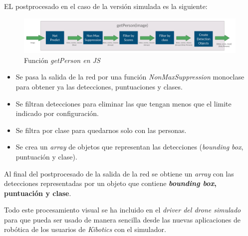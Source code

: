 EL postprocesado en el caso de la versión simulada es la siguiente:
\begin{figure}[H]
  \begin{center}
    \includegraphics[width=1\textwidth]{figures/simulado/getPersonjs.png}
		\caption{Función \textit{getPerson en JS}}
		\label{fig:getPersonjs}
		\end{center}
\end{figure}
\begin{itemize}
  \item Se pasa la salida de la red por una función \textit{NonMaxSuppression} monoclase para obtener ya las detecciones, puntuaciones y clases.
  \item Se filtran detecciones para eliminar las que tengan menos que el limite indicado por configuración.
  \item Se filtra por clase para quedarnos solo con las personas.
  \item Se crea un \textit{array} de objetos que representan las detecciones (\textit{bounding box}, puntuación y clase).
\end{itemize}
Al final del postprocesado de la salida de la red se obtiene un \textit{array} con las detecciones representadas por un objeto que contiene\textbf{ \textit{bounding box}, puntuación y clase}.

Todo este procesamiento visual se ha incluido en el \textit{driver del drone simulado} para que pueda ser usado de manera sencilla desde las nuevas aplicaciones de robótica de los usuarios de \textit{Kibotics} con el simulador.

